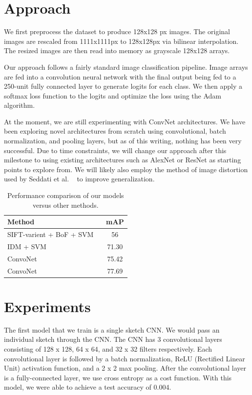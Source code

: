 \documentclass[10pt,twocolumn,letterpaper]{article}
\begin{document}
\section{Approach}
We first preprocess the dataset to produce 128x128 px images. The original images are rescaled from 1111x1111px to 128x128px via bilinear interpolation. The resized images are then read into memory as grayscale 128x128 arrays.

Our approach follows a fairly standard image classification pipeline. Image arrays are fed into a convolution neural network with the final output being fed to a 250-unit fully connected layer to generate logits for each class. We then apply a softmax loss function to the logits and optimize the loss using the Adam algorithm.

At the moment, we are still experimenting with ConvNet architectures. We have been exploring novel architectures from scratch using convolutional, batch normalization, and pooling layers, but as of this writing, nothing has been very successful. Due to time constraints, we will change our approach after this milestone to using existing architectures such as AlexNet or ResNet as starting points to explore from. We will likely also employ the method of image distortion used by Seddati et al. ~\cite{seddati2015deepsketch} to improve generalization.

\begin{table}[h]
\begin{center}
\begin{tabular}{|l|c|}
\hline
Method & mAP \\
\hline\hline
SIFT-varient + BoF + SVM  ~\cite{eitz2012hdhso}  &  56 \\
IDM + SVM ~\cite{yesilbek2015svm} & 71.30 \\
ConvoNet ~\cite{seddati2015deepsketch}  & 75.42\\
ConvoNet ~\cite{seddati2016deepsketch} & 77.69\\
\hline
\end{tabular}
\end{center}
\caption{Performance comparison of our models versus other methods.}
\end{table}


\section{Experiments}
The first model that we train is a single sketch CNN. We would pass an individual sketch through the CNN. The CNN has 3 convolutional layers consisting of 128 x 128, 64 x 64, and 32 x 32 filters respectively. Each convolutional layer is followed by a batch normalization, ReLU (Rectified Linear Unit) activation function, and a 2 x 2 max pooling. After the convolutional layer is a fully-connected layer, we use cross  entropy as a cost function. With this model, we were able to achieve a test accuracy of 0.004. 
\end{document}
